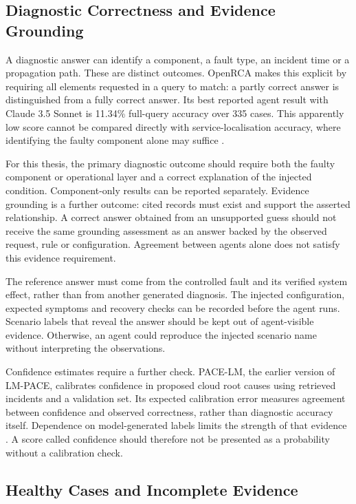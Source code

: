 \subsection{Diagnostic Correctness and Evidence Grounding}

A diagnostic answer can identify a component, a fault type, an incident
time or a propagation path. These are distinct outcomes. OpenRCA makes
this explicit by requiring all elements requested in a query to match:
a partly correct answer is distinguished from a fully correct answer.
Its best reported agent result with Claude 3.5 Sonnet is 11.34\% full-query
accuracy over 335 cases. This apparently low score cannot be compared
directly with service-localisation accuracy, where identifying the faulty
component alone may suffice
\parencite[Sections~2.3--5, Tables~1--4]{xu2025openrca}.

For this thesis, the primary diagnostic outcome should require both the
faulty component or operational layer and a correct explanation of the
injected condition. Component-only results can be reported separately.
Evidence grounding is a further outcome: cited records must exist and
support the asserted relationship. A correct answer obtained from an
unsupported guess should not receive the same grounding assessment as an
answer backed by the observed request, rule or configuration.
Agreement between agents alone does not satisfy this evidence requirement.

The reference answer must come from the controlled fault and its verified
system effect, rather than from another generated diagnosis. The injected
configuration, expected symptoms and recovery checks can be recorded
before the agent runs. Scenario labels that reveal the answer should be
kept out of agent-visible evidence. Otherwise, an agent could reproduce
the injected scenario name without interpreting the observations.

Confidence estimates require a further check. PACE-LM, the earlier
version of LM-PACE, calibrates confidence in proposed cloud root causes
using retrieved incidents and a validation set. Its expected calibration
error measures agreement between confidence and observed correctness,
rather than diagnostic accuracy itself. Dependence on model-generated
labels limits the strength of that evidence
\parencite[Sections~4--5]{zhang2023pacelm}. A score called confidence should
therefore not be presented as a probability without a calibration check.

\subsection{Healthy Cases and Incomplete Evidence}

